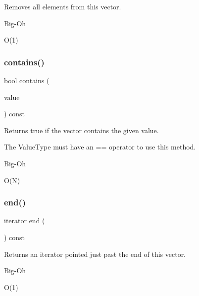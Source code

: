 Removes all elements from this vector. 

\begin{DoxyRefDesc}{Big-\/\+Oh}
\item[\mbox{\hyperlink{BigOh__BigOh000108}{Big-\/\+Oh}}]O(1) \end{DoxyRefDesc}
\mbox{\label{classVector_a6fbc1a150987e7e5320d244a3baeb560}} 
\subsubsection{\texorpdfstring{contains()}{contains()}}
{\footnotesize\ttfamily bool contains (\begin{DoxyParamCaption}\item[{const Value\+Type \&}]{value }\end{DoxyParamCaption}) const}



Returns true if the vector contains the given value. 

The Value\+Type must have an == operator to use this method. \begin{DoxyRefDesc}{Big-\/\+Oh}
\item[\mbox{\hyperlink{BigOh__BigOh000109}{Big-\/\+Oh}}]O(\+N) \end{DoxyRefDesc}
\mbox{\label{classVector_a68b688a51bd0cf6fb5bc2cba292209a8}} 
\subsubsection{\texorpdfstring{end()}{end()}}
{\footnotesize\ttfamily iterator end (\begin{DoxyParamCaption}{ }\end{DoxyParamCaption}) const\hspace{0.3cm}{\ttfamily [inline]}}



Returns an iterator pointed just past the end of this vector. 

\begin{DoxyRefDesc}{Big-\/\+Oh}
\item[\mbox{\hyperlink{BigOh__BigOh000154}{Big-\/\+Oh}}]O(1) \end{DoxyRefDesc}
\mbox{\label{classVector_a9552fd9e921fc047fdd59e59d82e88ef}} 
